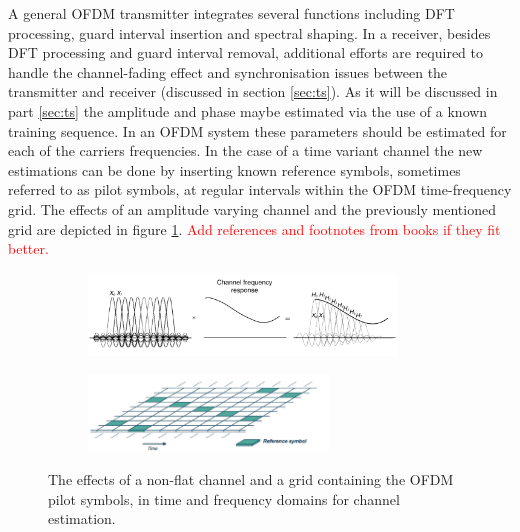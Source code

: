 \documentclass[12pt,a4paper,openright]{report}
\begin{document}
A general OFDM transmitter integrates several functions including DFT processing, guard interval insertion and spectral shaping. In a receiver, besides DFT processing and guard interval removal, additional efforts are required to handle the channel-fading effect and synchronisation issues between the transmitter and receiver (discussed in section \ref{sec:ts}).
As it will be discussed in part \ref{sec:ts} the amplitude and phase maybe estimated via the use of a known training sequence. In an OFDM system these parameters should be estimated for each of the carriers frequencies. In the case of a time variant channel the new estimations can be done by inserting known reference symbols, sometimes referred to as pilot symbols, at regular intervals within the OFDM time-frequency grid. The effects of an amplitude varying channel and the previously mentioned grid are depicted in figure \ref{fig:ofdmchannel}.
\textcolor{red}{Add references and footnotes from books if they fit better.}
\begin{figure}[H]
 \centering
	\begin{subfigure}[H]{0.9\textwidth}
 	\centering
    \includegraphics[width=0.9\textwidth]{ofdmchannel.pdf}

	\end{subfigure}
	
	\begin{subfigure}[H]{0.9\textwidth}
 	\centering
    \includegraphics[width=0.7\textwidth]{ofdmgrid.pdf}
 	\end{subfigure}
    \caption[The effects of a non-flat channel and a grid containing the OFDM pilot symbols]{The effects of a non-flat channel and a grid containing the OFDM pilot symbols, in time and frequency domains for channel estimation.}
    \label{fig:ofdmchannel}
\end{figure}
\end{document}
